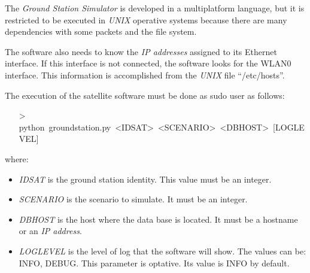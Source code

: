 The \emph{Ground Station Simulator} is developed in a multiplatform language, but it is restricted to be executed in \emph{UNIX} operative systems because there are many dependencies with some packets and the file system.

The software also needs to know the \emph{IP addresses} assigned to its Ethernet interface. If this interface is not connected, the software looks for the WLAN0 interface. This information is accomplished from the \emph{UNIX} file ``/etc/hosts''.

The execution of the satellite software must be done as sudo user as follows:
\begin{itemize}
\item[>]python~groundstation.py~<IDSAT>~<SCENARIO>~<DBHOST>~[LOGLEVEL]
\end{itemize}

where:
\begin{itemize}
\item \emph{IDSAT} is the ground station identity. This value must be an integer.
\item \emph{SCENARIO} is the scenario to simulate. It must be an integer.
\item \emph{DBHOST} is the host where the data base is located. It must be a hostname or an \emph{IP address}.
\item \emph{LOGLEVEL} is the level of log that the software will show. The
  values can be: INFO, DEBUG. This parameter is optative. Its value is INFO by default.
\end{itemize}

